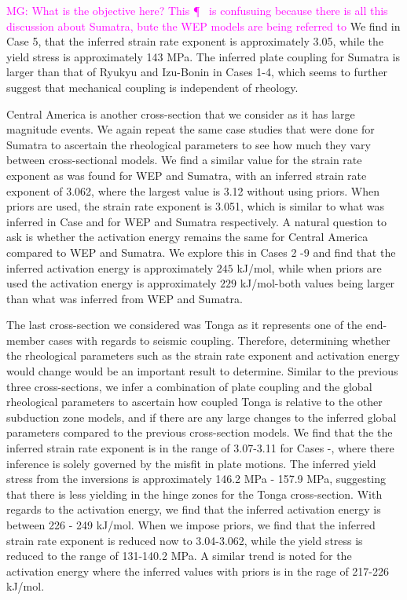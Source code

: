 \documentclass[12pt]{article}
\newcommand{\mgnote}[1]{\textcolor{magenta}{MG: #1}}
\begin{document}
\mgnote{What is the objective here? This \P~ is confusuing because there is all this discussion about Sumatra, bute the WEP models are being referred to} We find in Case 5, that the inferred strain rate exponent is approximately 3.05, while the yield stress is approximately 143 MPa. The inferred plate coupling for Sumatra is larger than that of Ryukyu and Izu-Bonin in Cases 1-4, which seems to further suggest that mechanical coupling is independent of rheology. 

Central America is another cross-section that we consider as it has large magnitude events. We again repeat the same case studies that were done for Sumatra to ascertain the rheological parameters to see how much they vary between cross-sectional models. We find a similar value for the strain rate exponent as was found for WEP and Sumatra, with an inferred strain rate exponent of 3.062, where the largest value is 3.12 without using priors. When priors are used, the strain rate exponent is 3.051, which is similar to what was inferred in Case and for WEP and Sumatra respectively. A natural question to ask is whether the activation energy remains the same for Central America compared to WEP and Sumatra. We explore this in Cases 2 -9 and find that the inferred activation energy is approximately $245$ kJ/mol, while when priors are used the activation energy is approximately $229$ kJ/mol-both values being larger than what was inferred from WEP and Sumatra. 

The last cross-section we considered was Tonga as it represents one of the end-member cases with regards to seismic coupling. Therefore, determining whether the rheological parameters such as the strain rate exponent and activation energy would change would be an important result to determine. Similar to the previous three cross-sections, we infer a combination of plate coupling and the global rheological parameters to ascertain how coupled Tonga is relative to the other subduction zone models, and if there are any large changes to the inferred global parameters compared to the previous cross-section models. We find that the the inferred strain rate exponent is in the range of 3.07-3.11 for Cases -, where there inference is solely governed by the misfit in plate motions. The inferred yield stress from the inversions is approximately 146.2 MPa - 157.9 MPa, suggesting that there is less yielding in the hinge zones for the Tonga cross-section. With regards to the activation energy, we find that the inferred activation energy is between 226 - 249 kJ/mol. When we impose priors, we find that the inferred strain rate exponent is reduced now to 3.04-3.062, while the yield stress is reduced to the range of  131-140.2 MPa. A similar trend is noted for the activation energy where the inferred values with priors is in the rage of 217-226 kJ/mol.
\end{document}
